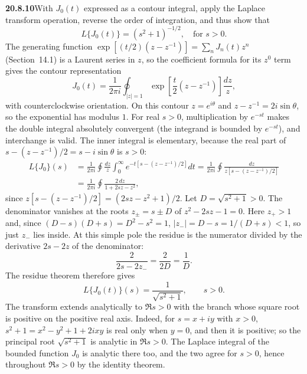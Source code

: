 \par\bigskip
\noindent\textbf{20.8.10}\quad With $J_{0}(t)$ expressed as a
contour integral, apply the Laplace transform operation, reverse
the order of integration, and thus show that
\[
L\{J_{0}(t)\}=(s^{2}+1)^{-1/2},\quad\text{for }s>0.
\]
\solution
The generating function
$\exp[(t/2)(z-z^{-1})]=\sum_nJ_n(t)z^n$ (Section~14.1) is a
Laurent series in $z$, so the coefficient formula for its
$z^0$ term gives the contour representation
\[
J_0(t)=\frac1{2\pi i}\oint_{|z|=1}
\exp\left[\frac t2(z-z^{-1})\right]\frac{dz}{z},
\]
with counterclockwise orientation. On this contour
$z=e^{i\theta}$ and $z-z^{-1}=2i\sin\theta$, so the exponential
has modulus $1$.
For real $s>0$, multiplication by $e^{-st}$ makes the double
integral absolutely convergent (the integrand is bounded by
$e^{-st}$), and interchange is valid. The inner integral is
elementary, because the real part of
$s-(z-z^{-1})/2=s-i\sin\theta$ is $s>0$:
\begin{align*}
L\{J_0\}(s)
&=\frac1{2\pi i}\oint\frac{dz}{z}
\int_0^\infty e^{-t[s-(z-z^{-1})/2]}dt
=\frac1{2\pi i}\oint\frac{dz}{z[s-(z-z^{-1})/2]}\\
&=\frac1{2\pi i}\oint\frac{2\,dz}{1+2sz-z^2},
\end{align*}
since $z[s-(z-z^{-1})/2]=(2sz-z^2+1)/2$.
Let $D=\sqrt{s^2+1}>0$. The denominator vanishes at the roots
$z_\pm=s\pm D$ of $z^2-2sz-1=0$. Here $z_+>1$ and, since
$(D-s)(D+s)=D^2-s^2=1$,
$|z_-|=D-s=1/(D+s)<1$, so just $z_-$ lies inside.
At this simple pole the residue is the numerator divided by
the derivative $2s-2z$ of the denominator:
\[
\frac{2}{2s-2z_-}=\frac{2}{2D}=\frac1D.
\]
The residue theorem therefore gives
\[
\boxed{L\{J_0(t)\}(s)=\frac1{\sqrt{s^2+1}}},\qquad s>0.
\]
The transform extends analytically to $\Re s>0$ with the
branch whose square root is positive on the positive real axis.
Indeed, for $s=x+iy$ with $x>0$, $s^2+1=x^2-y^2+1+2ixy$ is real
only when $y=0$, and then it is positive; so the principal root
$\sqrt{s^2+1}$ is analytic in $\Re s>0$. The Laplace integral of
the bounded function $J_0$ is analytic there too, and the two
agree for $s>0$, hence throughout $\Re s>0$ by the identity
theorem.

